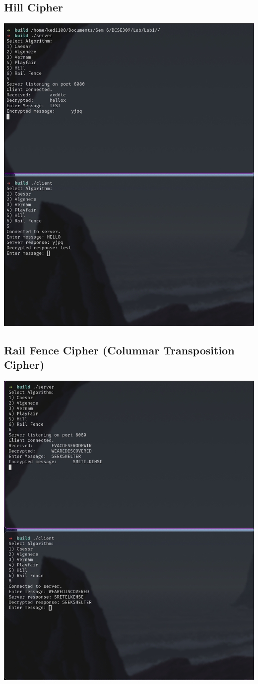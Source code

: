 \documentclass[titlepage]{article}
\begin{document}
\subsection{Hill Cipher}
\includegraphics[scale=0.4]{hill.png}

\subsection{Rail Fence Cipher (Columnar Transposition Cipher)}
\includegraphics[scale=0.4]{columnar_transposition.png}
\end{document}
